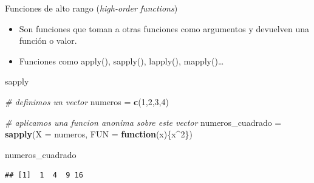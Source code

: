 \documentclass[ignorenonframetext,]{beamer}
\newenvironment{Shaded}{\begin{snugshade}}{\end{snugshade}}
\newcommand{\CommentTok}[1]{\textcolor[rgb]{0.56,0.35,0.01}{\textit{#1}}}
\newcommand{\ControlFlowTok}[1]{\textcolor[rgb]{0.13,0.29,0.53}{\textbf{#1}}}
\newcommand{\DataTypeTok}[1]{\textcolor[rgb]{0.13,0.29,0.53}{#1}}
\newcommand{\DecValTok}[1]{\textcolor[rgb]{0.00,0.00,0.81}{#1}}
\newcommand{\KeywordTok}[1]{\textcolor[rgb]{0.13,0.29,0.53}{\textbf{#1}}}
\newcommand{\NormalTok}[1]{#1}
\newcommand{\OperatorTok}[1]{\textcolor[rgb]{0.81,0.36,0.00}{\textbf{#1}}}
\newcommand{\StringTok}[1]{\textcolor[rgb]{0.31,0.60,0.02}{#1}}
\providecommand{\tightlist}{%
  \setlength{\itemsep}{0pt}\setlength{\parskip}{0pt}}
\begin{document}
\begin{frame}{Funciones de alto rango (\emph{high-order functions})}
\protect\hypertarget{funciones-de-alto-rango-high-order-functions}{}

\begin{itemize}
\tightlist
\item
  Son funciones que toman a otras funciones como argumentos y devuelven
  una función o valor.
\item
  Funciones como apply(), sapply(), lapply(), mapply()\ldots{}
\end{itemize}

\end{frame}

\begin{frame}[fragile]{sapply}
\protect\hypertarget{sapply}{}

\small

\begin{Shaded}
\begin{Highlighting}[]
\CommentTok{# definimos un vector}
\NormalTok{numeros =}\StringTok{ }\KeywordTok{c}\NormalTok{(}\DecValTok{1}\NormalTok{,}\DecValTok{2}\NormalTok{,}\DecValTok{3}\NormalTok{,}\DecValTok{4}\NormalTok{)}

\CommentTok{# aplicamos una funcion anonima sobre este vector}
\NormalTok{numeros_cuadrado =}\StringTok{ }\KeywordTok{sapply}\NormalTok{(}\DataTypeTok{X =}\NormalTok{ numeros, }\DataTypeTok{FUN =} \ControlFlowTok{function}\NormalTok{(x)\{x}\OperatorTok{^}\DecValTok{2}\NormalTok{\})}

\NormalTok{numeros_cuadrado}
\end{Highlighting}
\end{Shaded}

\begin{verbatim}
## [1]  1  4  9 16
\end{verbatim}

\normalsize

\end{frame}
\end{document}
